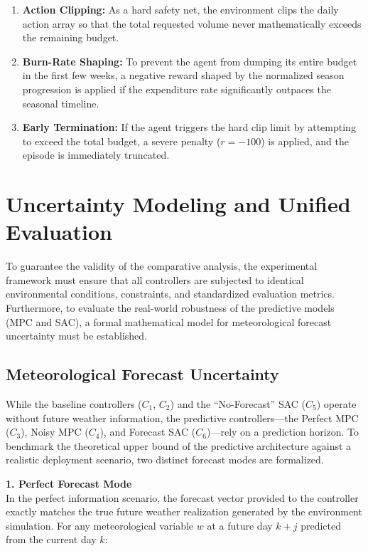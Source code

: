 \documentclass[11pt, a4paper]{article}
\begin{document}
\begin{enumerate}
    \item \textbf{Action Clipping:} As a hard safety net, the environment clips the daily action array so that the total requested volume never mathematically exceeds the remaining budget.
    \item \textbf{Burn-Rate Shaping:} To prevent the agent from dumping its entire budget in the first few weeks, a negative reward shaped by the normalized season progression is applied if the expenditure rate significantly outpaces the seasonal timeline.
    \item \textbf{Early Termination:} If the agent triggers the hard clip limit by attempting to exceed the total budget, a severe penalty ($r = -100$) is applied, and the episode is immediately truncated.
\end{enumerate}

\section{Uncertainty Modeling and Unified Evaluation}

To guarantee the validity of the comparative analysis, the experimental framework must ensure that all controllers are subjected to identical environmental conditions, constraints, and standardized evaluation metrics. Furthermore, to evaluate the real-world robustness of the predictive models (MPC and SAC), a formal mathematical model for meteorological forecast uncertainty must be established.

\subsection{Meteorological Forecast Uncertainty}

While the baseline controllers ($C_1$, $C_2$) and the ``No-Forecast'' SAC ($C_5$) operate without future weather information, the predictive controllers---the Perfect MPC ($C_3$), Noisy MPC ($C_4$), and Forecast SAC ($C_6$)---rely on a prediction horizon. To benchmark the theoretical upper bound of the predictive architecture against a realistic deployment scenario, two distinct forecast modes are formalized.

\textbf{1. Perfect Forecast Mode} \\
In the perfect information scenario, the forecast vector provided to the controller exactly matches the true future weather realization generated by the environment simulation. For any meteorological variable $w$ at a future day $k+j$ predicted from the current day $k$:
\end{document}
